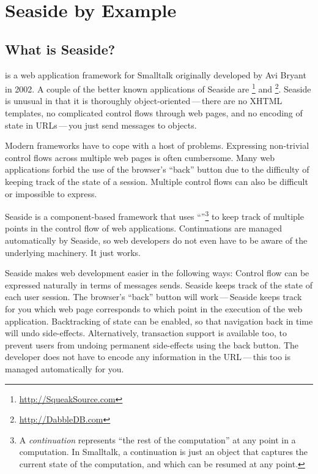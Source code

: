 \documentclass[a4paper,10pt,twoside]{book}
\begin{document}
	\sloppy
\fi
\chapter{Seaside by Example}
\label{cha:seaside}

\section{What is Seaside?}

 is a web application framework for Smalltalk originally developed by Avi Bryant in 2002.
A couple of the better known applications of Seaside are \footnote{\url{http://SqueakSource.com}} and \footnote{\url{http://DabbleDB.com}}.
Seaside is unusual in that it is thoroughly object-oriented\,---\,there are no XHTML templates, no complicated control flows through web pages, and no encoding of state in URLs\,---\,you just send messages to objects.

Modern  frameworks have to cope with a host of problems. Expressing non-trivial control flows across multiple web pages is often cumbersome. Many web applications forbid the use of the browser's ``back'' button due to the difficulty of keeping track of the state of a session. Multiple control flows can also be difficult or impossible to express.

Seaside is a component-based framework that uses ``''\footnote{A \emph{continuation} represents ``the rest of the computation'' at any point in a computation. In Smalltalk, a continuation is just an object that captures the current state of the computation, and which can be resumed at any point.} to keep track of multiple points in the control flow of web applications. Continuations are managed automatically by Seaside, so web developers do not even have to be aware of the underlying machinery. It just works.

Seaside makes web development easier in the following ways:
Control flow can be expressed naturally in terms of messages sends.
Seaside keeps track of the state of each user session.
The browser's ``back'' button will work\,---\,Seaside keeps track for you which web page corresponds to which point in the execution of the web application.
Backtracking of state can be enabled, so that navigation back in time will undo side-effects.
Alternatively, transaction support is available too, to prevent users from undoing permanent side-effects using the back button.
The developer does not have to encode any information in the URL\,---\,this too is managed automatically for you.
\end{document}
